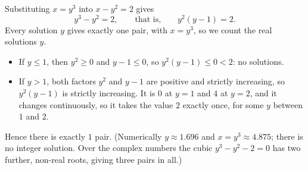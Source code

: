 Substituting $x=y^3$ into $x-y^2=2$ gives
\[y^3-y^2=2,\qquad\text{that is,}\qquad y^2(y-1)=2 .\]
Every solution $y$ gives exactly one pair, with $x=y^3$, so we count the real solutions $y$.
\begin{itemize}
\item If $y\le1$, then $y^2\ge0$ and $y-1\le0$, so $y^2(y-1)\le0<2$: no solutions.
\item If $y>1$, both factors $y^2$ and $y-1$ are positive and strictly increasing, so $y^2(y-1)$ is strictly increasing. It is $0$ at $y=1$ and $4$ at $y=2$, and it changes continuously, so it takes the value $2$ exactly once, for some $y$ between $1$ and $2$.
\end{itemize}
Hence there is exactly $\boxed{1}$ pair. (Numerically $y\approx1.696$ and $x=y^3\approx4.875$; there is no integer solution. Over the complex numbers the cubic $y^3-y^2-2=0$ has two further, non-real roots, giving three pairs in all.)
